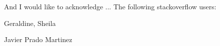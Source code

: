 
\begin{acknowledgements}      


And I would like to acknowledge ...
The following stackoverflow users:

Geraldine, Sheila

Javier Prado Martinez

\end{acknowledgements}
